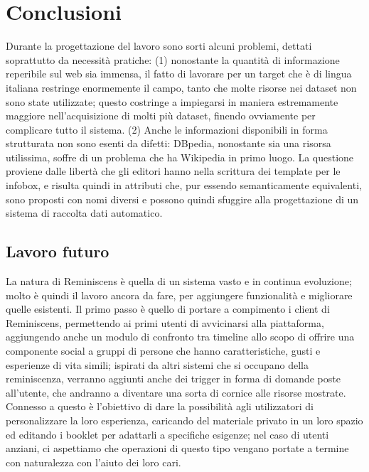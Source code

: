 \documentclass[sigproc-sp.tex]{subfiles}
\begin{document}
\section{Conclusioni}
Durante la progettazione del lavoro sono sorti alcuni problemi, dettati soprattutto da necessità pratiche: (1) nonostante la quantità di informazione reperibile sul web sia immensa, il fatto di lavorare per un target che è di lingua italiana restringe enormemente il campo, tanto che molte risorse nei dataset non sono state utilizzate; questo costringe a impiegarsi in maniera estremamente maggiore nell’acquisizione di molti più dataset, finendo ovviamente per complicare tutto il sistema. (2) Anche le informazioni disponibili in forma strutturata non sono esenti da difetti: DBpedia, nonostante sia una risorsa utilissima, soffre di un problema che ha Wikipedia in primo luogo. La questione proviene dalle libertà che gli editori hanno nella scrittura dei template per le infobox, e risulta quindi in attributi che, pur essendo semanticamente equivalenti, sono proposti con nomi diversi e possono quindi sfuggire alla progettazione di un sistema di raccolta dati automatico.

\subsection{Lavoro futuro}
\label{subsec:futurework}
La natura di Reminiscens è quella di un sistema vasto e in continua evoluzione; molto è quindi il lavoro ancora da fare, per aggiungere funzionalità e migliorare quelle esistenti. Il primo passo è quello di portare a compimento i client di Reminiscens, permettendo ai primi utenti di avvicinarsi alla piattaforma, aggiungendo anche un modulo di confronto tra timeline allo scopo di offrire una componente social a gruppi di persone che hanno caratteristiche, gusti e esperienze di vita simili; ispirati da altri sistemi che si occupano della reminiscenza, verranno aggiunti anche dei trigger in forma di domande poste all’utente, che andranno a diventare una sorta di cornice alle risorse mostrate. Connesso a questo è l’obiettivo di dare la possibilità agli utilizzatori di personalizzare la loro esperienza, caricando del materiale privato in un loro spazio ed editando i booklet per adattarli a specifiche esigenze; nel caso di utenti anziani, ci aspettiamo che operazioni di questo tipo vengano portate a termine con naturalezza con l’aiuto dei loro cari. 
\end{document}
